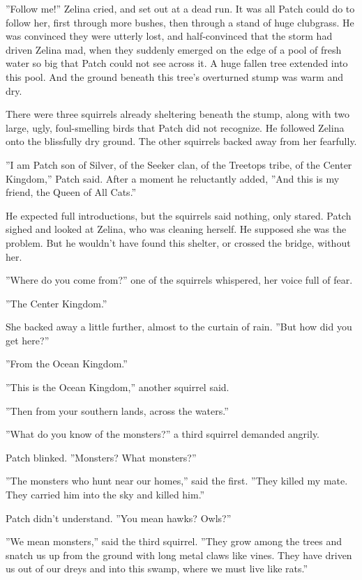 \documentclass[12pt]{book}
\begin{document}
''Follow me!'' Zelina cried, and set out at a dead run. It was all Patch could do to follow her, first through more bushes, then through a stand of huge clubgrass. He was convinced they were utterly lost, and half-convinced that the storm had driven Zelina mad, when they suddenly emerged on the edge of a pool of fresh water so big that Patch could not see across it. A huge fallen tree extended into this pool. And the ground beneath this tree's overturned stump was warm and dry.

There were three squirrels already sheltering beneath the stump, along with two large, ugly, foul-smelling birds that Patch did not recognize. He followed Zelina onto the blissfully dry ground. The other squirrels backed away from her fearfully.

''I am Patch son of Silver, of the Seeker clan, of the Treetops tribe, of the Center Kingdom,'' Patch said. After a moment he reluctantly added, ''And this is my friend, the Queen of All Cats.''

He expected full introductions, but the squirrels said nothing, only stared. Patch sighed and looked at Zelina, who was cleaning herself. He supposed she was the problem. But he wouldn't have found this shelter, or crossed the bridge, without her.

''Where do you come from?'' one of the squirrels whispered, her voice full of fear.

''The Center Kingdom.''

She backed away a little further, almost to the curtain of rain. ''But how did you get here?''

''From the Ocean Kingdom.''

''This is the Ocean Kingdom,'' another squirrel said.

''Then from your southern lands, across the waters.''

''What do you know of the monsters?'' a third squirrel demanded angrily.

Patch blinked. ''Monsters? What monsters?''

''The monsters who hunt near our homes,'' said the first. ''They killed my mate. They carried him into the sky and killed him.''

Patch didn't understand. ''You mean hawks? Owls?''

''We mean monsters,'' said the third squirrel. ''They grow among the trees and snatch us up from the ground with long metal claws like vines. They have driven us out of our dreys and into this swamp, where we must live like rats.''
\end{document}
